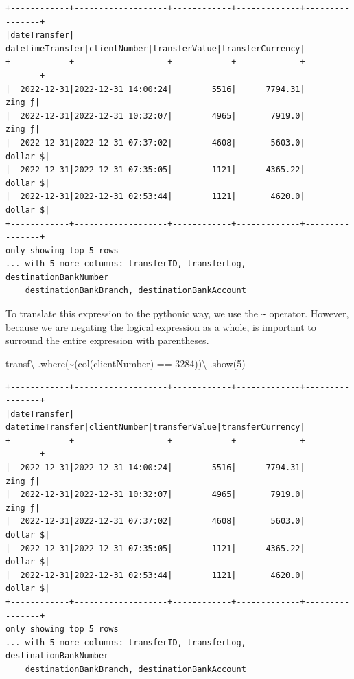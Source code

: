 \documentclass[
  11pt,
  letterpaper,
  DIV=11,
  numbers=noendperiod]{scrreprt}
\newenvironment{Shaded}{\begin{snugshade}}{\end{snugshade}}
\newcommand{\DecValTok}[1]{\textcolor[rgb]{0.68,0.00,0.00}{#1}}
\newcommand{\NormalTok}[1]{\textcolor[rgb]{0.00,0.23,0.31}{#1}}
\newcommand{\OperatorTok}[1]{\textcolor[rgb]{0.37,0.37,0.37}{#1}}
\newcommand{\StringTok}[1]{\textcolor[rgb]{0.13,0.47,0.30}{#1}}
\begin{document}
\begin{verbatim}
+------------+-------------------+------------+-------------+----------------+
|dateTransfer|   datetimeTransfer|clientNumber|transferValue|transferCurrency|
+------------+-------------------+------------+-------------+----------------+
|  2022-12-31|2022-12-31 14:00:24|        5516|      7794.31|          zing ƒ|
|  2022-12-31|2022-12-31 10:32:07|        4965|       7919.0|          zing ƒ|
|  2022-12-31|2022-12-31 07:37:02|        4608|       5603.0|        dollar $|
|  2022-12-31|2022-12-31 07:35:05|        1121|      4365.22|        dollar $|
|  2022-12-31|2022-12-31 02:53:44|        1121|       4620.0|        dollar $|
+------------+-------------------+------------+-------------+----------------+
only showing top 5 rows
... with 5 more columns: transferID, transferLog, destinationBankNumber
    destinationBankBranch, destinationBankAccount
\end{verbatim}

To translate this expression to the pythonic way, we use the
\texttt{\textasciitilde{}} operator. However, because we are negating
the logical expression as a whole, is important to surround the entire
expression with parentheses.

\begin{Shaded}
\begin{Highlighting}[]
\NormalTok{transf}\OperatorTok{\textbackslash{}}
\NormalTok{  .where(}\OperatorTok{\textasciitilde{}}\NormalTok{(col(}\StringTok{\textquotesingle{}clientNumber\textquotesingle{}}\NormalTok{) }\OperatorTok{==} \DecValTok{3284}\NormalTok{))}\OperatorTok{\textbackslash{}}
\NormalTok{  .show(}\DecValTok{5}\NormalTok{)}
\end{Highlighting}
\end{Shaded}

\begin{verbatim}
+------------+-------------------+------------+-------------+----------------+
|dateTransfer|   datetimeTransfer|clientNumber|transferValue|transferCurrency|
+------------+-------------------+------------+-------------+----------------+
|  2022-12-31|2022-12-31 14:00:24|        5516|      7794.31|          zing ƒ|
|  2022-12-31|2022-12-31 10:32:07|        4965|       7919.0|          zing ƒ|
|  2022-12-31|2022-12-31 07:37:02|        4608|       5603.0|        dollar $|
|  2022-12-31|2022-12-31 07:35:05|        1121|      4365.22|        dollar $|
|  2022-12-31|2022-12-31 02:53:44|        1121|       4620.0|        dollar $|
+------------+-------------------+------------+-------------+----------------+
only showing top 5 rows
... with 5 more columns: transferID, transferLog, destinationBankNumber
    destinationBankBranch, destinationBankAccount
\end{verbatim}
\end{document}
